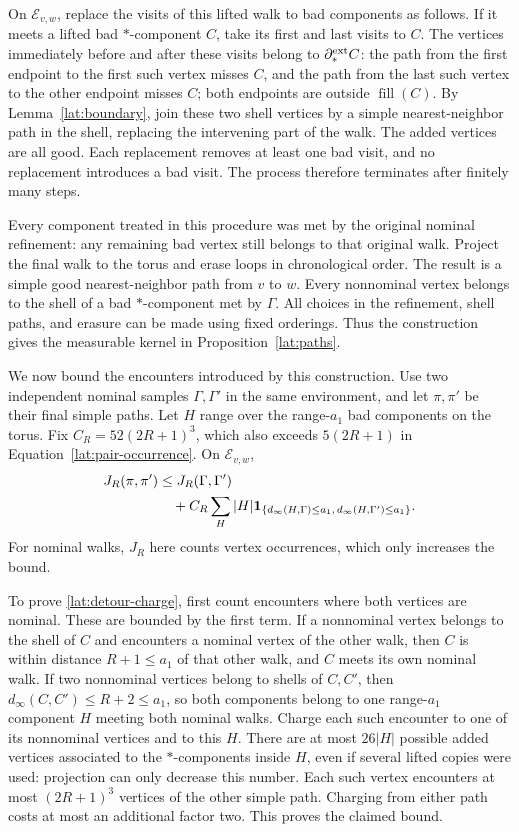 On $\mathcal E_{v,w}$, replace the visits of this lifted walk to bad
components as follows.  If it meets a lifted bad $*$-component $C$,
take its first and last visits to $C$.  The vertices immediately before
and after these visits belong to $\partial_*^{\rm ext}C$: the path
from the first endpoint to the first such vertex misses $C$, and the
path from the last such vertex to the other endpoint misses $C$;
both endpoints are outside $\operatorname{fill}(C)$.  By
Lemma~\ref{lat:boundary}, join these two shell vertices by a simple
nearest-neighbor path in the shell, replacing the intervening part of
the walk.  The added vertices are all good.  Each replacement removes
at least one bad visit, and no replacement introduces a bad visit.
The process therefore terminates after finitely many steps.

Every component treated in this procedure was met by the original
nominal refinement: any remaining bad vertex still belongs to that
original walk.  Project the final walk to the torus and erase loops
in chronological order.  The result is a simple good nearest-neighbor
path from $v$ to $w$.  Every nonnominal vertex belongs to the shell of
a bad $*$-component met by $\Gamma$.  All choices in the refinement,
shell paths, and erasure can be made using fixed orderings.  Thus the
construction gives the measurable kernel in Proposition~\ref{lat:paths}.

We now bound the encounters introduced by this construction.  Use two
independent nominal samples $\Gamma,\Gamma'$ in the same environment,
and let $\pi,\pi'$ be their final simple paths.  Let $H$ range over
the range-$a_1$ bad components on the torus. Fix
$C_R=52(2R+1)^3$, which also exceeds $5(2R+1)$ in
Equation~\eqref{lat:pair-occurrence}. On $\mathcal E_{v,w}$,
\begin{align}\label{lat:detour-charge}
 J_R(\pi,\pi')
 &\le J_R(\Gamma,\Gamma')\notag\\
 &\quad+C_R\sum_H |H|
       \mathbf 1_{\{d_\infty(H,\Gamma)\le a_1,\,
                  d_\infty(H,\Gamma')\le a_1\}}.
\end{align}
For nominal walks, $J_R$ here counts vertex occurrences, which only
increases the bound.

To prove \eqref{lat:detour-charge}, first count encounters where both
vertices are nominal.  These are bounded by the first term.  If a
nonnominal vertex belongs to the shell of $C$ and encounters a nominal
vertex of the other walk, then $C$ is within distance $R+1\le a_1$
of that other walk, and $C$ meets its own nominal walk.  If two
nonnominal vertices belong to shells of $C,C'$, then
$d_\infty(C,C')\le R+2\le a_1$, so both components belong to one
range-$a_1$ component $H$ meeting both nominal walks.  Charge each
such encounter to one of its nonnominal vertices and to this $H$.
There are at most $26|H|$ possible added vertices associated to the
$*$-components inside $H$, even if several lifted copies were used:
projection can only decrease this number.  Each such vertex encounters
at most $(2R+1)^3$ vertices of the other simple path.  Charging from
either path costs at most an additional factor two.  This proves the
claimed bound.

